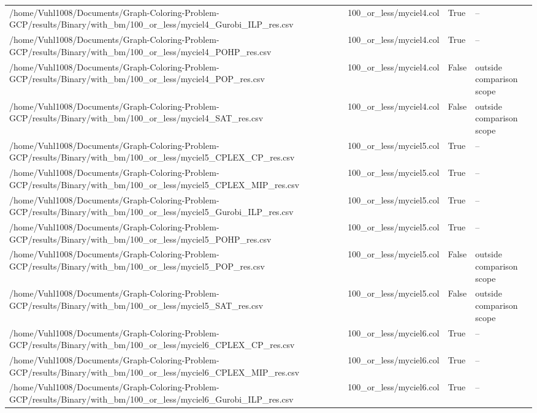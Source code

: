 \begin{table}[htbp]
\begin{tabular}{llll}
/home/Vuhl1008/Documents/Graph-Coloring-Problem-GCP/results/Binary/with\_bm/100\_or\_less/myciel4\_Gurobi\_ILP\_res.csv & 100\_or\_less/myciel4.col & True & -- \\
/home/Vuhl1008/Documents/Graph-Coloring-Problem-GCP/results/Binary/with\_bm/100\_or\_less/myciel4\_POHP\_res.csv & 100\_or\_less/myciel4.col & True & -- \\
/home/Vuhl1008/Documents/Graph-Coloring-Problem-GCP/results/Binary/with\_bm/100\_or\_less/myciel4\_POP\_res.csv & 100\_or\_less/myciel4.col & False & outside comparison scope \\
/home/Vuhl1008/Documents/Graph-Coloring-Problem-GCP/results/Binary/with\_bm/100\_or\_less/myciel4\_SAT\_res.csv & 100\_or\_less/myciel4.col & False & outside comparison scope \\
/home/Vuhl1008/Documents/Graph-Coloring-Problem-GCP/results/Binary/with\_bm/100\_or\_less/myciel5\_CPLEX\_CP\_res.csv & 100\_or\_less/myciel5.col & True & -- \\
/home/Vuhl1008/Documents/Graph-Coloring-Problem-GCP/results/Binary/with\_bm/100\_or\_less/myciel5\_CPLEX\_MIP\_res.csv & 100\_or\_less/myciel5.col & True & -- \\
/home/Vuhl1008/Documents/Graph-Coloring-Problem-GCP/results/Binary/with\_bm/100\_or\_less/myciel5\_Gurobi\_ILP\_res.csv & 100\_or\_less/myciel5.col & True & -- \\
/home/Vuhl1008/Documents/Graph-Coloring-Problem-GCP/results/Binary/with\_bm/100\_or\_less/myciel5\_POHP\_res.csv & 100\_or\_less/myciel5.col & True & -- \\
/home/Vuhl1008/Documents/Graph-Coloring-Problem-GCP/results/Binary/with\_bm/100\_or\_less/myciel5\_POP\_res.csv & 100\_or\_less/myciel5.col & False & outside comparison scope \\
/home/Vuhl1008/Documents/Graph-Coloring-Problem-GCP/results/Binary/with\_bm/100\_or\_less/myciel5\_SAT\_res.csv & 100\_or\_less/myciel5.col & False & outside comparison scope \\
/home/Vuhl1008/Documents/Graph-Coloring-Problem-GCP/results/Binary/with\_bm/100\_or\_less/myciel6\_CPLEX\_CP\_res.csv & 100\_or\_less/myciel6.col & True & -- \\
/home/Vuhl1008/Documents/Graph-Coloring-Problem-GCP/results/Binary/with\_bm/100\_or\_less/myciel6\_CPLEX\_MIP\_res.csv & 100\_or\_less/myciel6.col & True & -- \\
/home/Vuhl1008/Documents/Graph-Coloring-Problem-GCP/results/Binary/with\_bm/100\_or\_less/myciel6\_Gurobi\_ILP\_res.csv & 100\_or\_less/myciel6.col & True & -- \\

\end{tabular}
\end{table}
